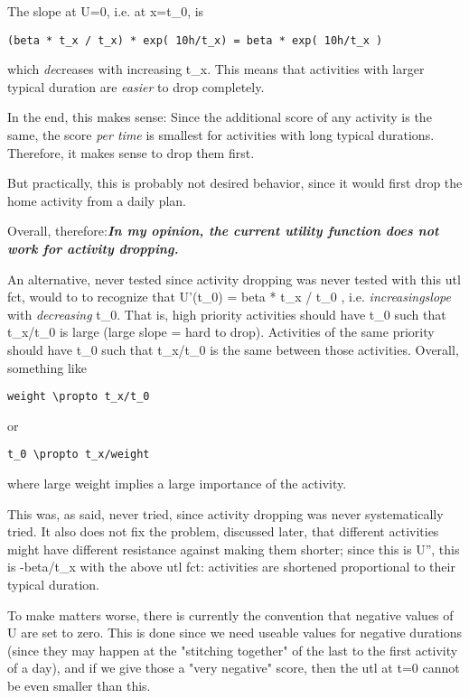 The slope at U=0, i.e. at x=t\_0, is
\begin{verbatim}
(beta * t_x / t_x) * exp( 10h/t_x) = beta * exp( 10h/t_x )
\end{verbatim}

which \emph{de}creases with increasing t\_x. This means that activities with larger typical duration are \emph{easier} to drop completely.

In the end, this makes sense: Since the additional score of any activity is the same, the score \emph{per time} is smallest for activities with long typical durations. Therefore, it makes sense to drop them first.

But practically, this is probably not desired behavior, since it would first drop the home activity from a daily plan.

Overall, therefore:\emph{\textbf{In my opinion, the current utility function does not work for activity dropping.}}



An  alternative, never tested since activity dropping was never  tested with  this utl fct, would to to recognize that U'(t\_0) = beta *  t\_x / t\_0 ,  i.e. \emph{increasing}\emph{slope} with \emph{decreasing}  t\_0.  That is, high priority activities should have t\_0 such that  t\_x/t\_0 is  large (large slope = hard to drop). Activities of the  same priority  should have t\_0 such that t\_x/t\_0 is the same between  those activities.  Overall, something like
\begin{verbatim}
weight \propto t_x/t_0

\end{verbatim}

or
\begin{verbatim}
t_0 \propto t_x/weight
\end{verbatim}

where large weight implies a large importance of the activity.

This  was, as said, never tried, since activity dropping was never   systematically tried. It also does not fix the problem, discussed   later, that different activities might have different resistance  against  making them shorter; since this is U'', this is -beta/t\_x  with the  above utl fct: activities are shortened proportional to their  typical  duration.



To make matters worse, there is currently the  convention that  negative values of U are set to zero. This is done  since we need  useable values for negative durations (since they may  happen at the  "stitching together" of the last to the first activity of a  day), and  if we give those a "very negative" score, then the utl at t=0  cannot be  even smaller than this.

